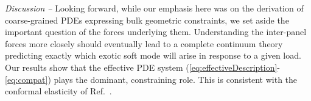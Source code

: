 \documentclass[aps,prl,twocolumn,superscriptaddress]{revtex4-1}
\begin{document}


\textit{Discussion --} Looking forward, while our emphasis here was on the derivation of  coarse-grained PDEs expressing bulk geometric constraints, we set aside the important question of the forces underlying them. Understanding the inter-panel forces more closely should eventually lead to a complete continuum theory predicting exactly which exotic soft mode will arise in response to a given load. Our results show that the effective PDE system (\ref{eq:effectiveDescription}-\ref{eq:compat}) plays the dominant, constraining role. This is consistent with the conformal elasticity of Ref.~\cite{czajkowski2022conformal}.
\end{document}
